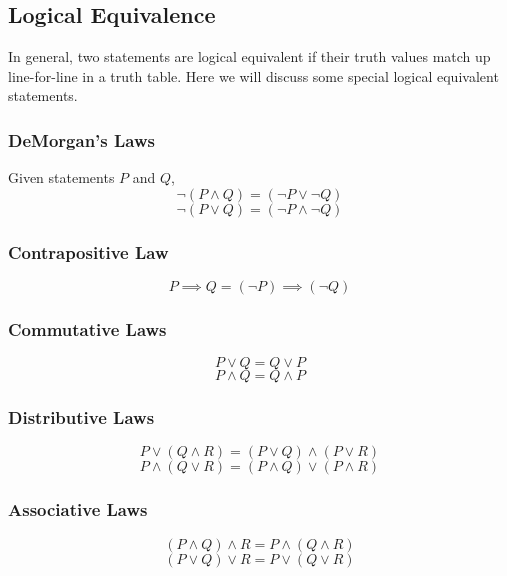 \subsection{Logical Equivalence}
In general, two statements are logical equivalent if their truth values match up line-for-line in a truth table. 
Here we will discuss some special logical equivalent statements.

\subsubsection{DeMorgan's Laws}
Given statements $P$ and $Q$, 
\begin{equation*}
    \neg \left(P \wedge Q\right) = (\neg P \vee \neg Q)
\end{equation*}
\begin{equation*}
    \neg \left(P \vee Q\right) = (\neg P \wedge \neg Q)
\end{equation*}

\subsubsection{Contrapositive Law}
\[
    P \implies Q = (\neg P) \implies (\neg Q)
\]

\subsubsection{Commutative Laws}
\[
    P \vee Q = Q \vee P
\]
\[
    P \wedge Q = Q \wedge P
\]

\subsubsection{Distributive Laws}
\[
    P \vee (Q \wedge R) = (P \vee Q) \wedge (P \vee R)
\]
\[
    P \wedge (Q \vee R) = (P \wedge Q) \vee (P \wedge R)
\]

\subsubsection{Associative Laws}
\[
    (P \wedge Q) \wedge R = P \wedge (Q \wedge R)
\]
\[
    (P \vee Q) \vee R = P \vee (Q \vee R)
\]
\newpage